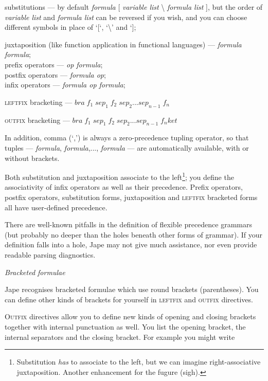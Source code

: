 {\textbullet}\tab substitutions --- by default \textit{formula} [ \textit{variable list} {\textbackslash} \textit{formula list} ], but the order of \textit{variable list} and \textit{formula list} can be reversed if you wish, and you can choose different symbols in place of `[`, `{\textbackslash}' and `];


{\textbullet}\tab juxtaposition (like function application in functional languages) --- \textit{formula formula};\\
{\textbullet}\tab prefix operators --- \textit{op formula};\\
{\textbullet}\tab postfix operators --- \textit{formula op};\\
{\textbullet}\tab infix operators --- \textit{formula op formula};


{\textbullet}\tab \textsc{leftfix} bracketing --- $bra\;f_{1} \;sep_{1} \;f_{2} \;sep_{2} ...sep_{n-1} \;f_{n} $



{\textbullet}\tab \textsc{outfix} bracketing --- $bra\;f_{1} \;sep_{1} \;f_{2} \;sep_{2} ...sep_{n-1} \;f_{n} ket$



In addition, comma (`,') is always a zero-precedence tupling operator, so that tuples --- \textit{formula}, \textit{formula},..., \textit{formula} --- are automatically available, with or without brackets.


Both substitution and juxtaposition associate to the left\footnote{Substitution \textit{has} to associate to the left, but we can imagine right-associative juxtaposition. Another enhancement for the fugure (sigh).}; you define the associativity of infix operators as well as their precedence. Prefix operators, postfix operators, substitution forms, juxtaposition and \textsc{leftfix} bracketed forms all have user-defined precedence.


There are well-known pitfalls in the definition of flexible precedence grammars (but probably no deeper than the holes beneath other forms of grammar). If your definition falls into a hole, Jape may not give much assistance, nor even provide readable parsing diagnostics.


\textit{Bracketed formulae}


Jape recognises bracketed formulae which use round brackets (parentheses). You can define other kinds of brackets for yourself in \textsc{leftfix} and \textsc{outfix} directives.


\textsc{Outfix} directives allow you to define new kinds of opening and closing brackets together with internal punctuation as well. You list the opening bracket, the internal separators and the closing bracket. For example you might write


